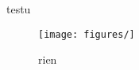 \documentclass{article}
\begin{document}
	testu
	\begin{figure}[ht]
		\centering
		\texttt{[image: figures/]}
		\caption{rien}
		\label{a}
	\end{figure}
\end{document}
